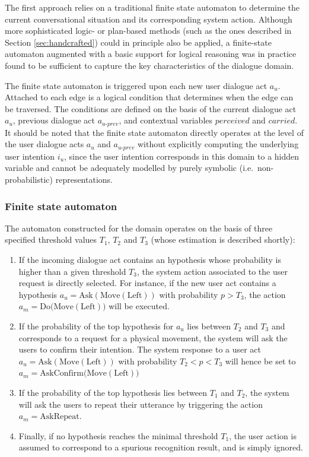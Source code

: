 The first approach relies on a traditional finite state automaton to determine the current conversational situation and its corresponding system action.  Although more sophisticated logic- or plan-based methods (such as the ones described in Section \ref{sec:handcrafted}) could in principle also be applied, a finite-state automaton augmented with a basic support for logical reasoning was in practice found to be sufficient to capture the key characteristics of the dialogue domain. 

The finite state automaton is triggered upon each new user dialogue act $a_u$. Attached to each edge is a logical condition that determines when the edge can be traversed. The conditions are defined on the basis of the current dialogue act $a_u$, previous dialogue act $a_{u\mbox{-}prev}$, and contextual variables $\mathit{perceived}$ and $\mathit{carried}$. It should be noted that the finite state automaton directly operates at the level of the user dialogue acts $a_u$ and $a_{u\mbox{-}prev}$ without explicitly computing the underlying user intention $i_u$, since the user intention corresponds in this domain to a hidden variable and cannot be adequately modelled by purely symbolic (i.e.\ non-probabilistic) representations. 

\subsubsection*{Finite state automaton}

The automaton constructed for the domain operates on the basis of three specified threshold values $T_1$, $T_2$ and $T_3$ (whose estimation is described shortly):
\begin{enumerate}
\item If the incoming dialogue act contains an hypothesis whose probability is higher than a given threshold $T_3$, the system action associated to the user request is directly selected.  For instance, if the new user act contains a hypothesis $a_u = \mathrm{Ask(Move(Left))}$ with probability $p > T_3$, the action $a_m = \mathrm{Do(Move(Left)})$ will be executed.
\item If the probability of the top hypothesis for $a_u$ lies between $T_2$ and $T_3$ and corresponds to a request for a physical movement, the system will ask the users to confirm their intention.  The system response to a user act $a_u = \mathrm{Ask(Move(Left))}$ with probability $T_2 < p < T_3$ will hence be set to $a_m = \mathrm{AskConfirm(Move(Left)})$
\item If the probability of the top hypothesis lies between $T_1$ and $T_2$, the system will ask the users to repeat their utterance by triggering the action $a_m = \mathrm{AskRepeat}$. 
\item Finally, if no hypothesis reaches the minimal threshold $T_1$, the user action is assumed to correspond to a spurious recognition result, and is simply ignored.
\end{enumerate}

